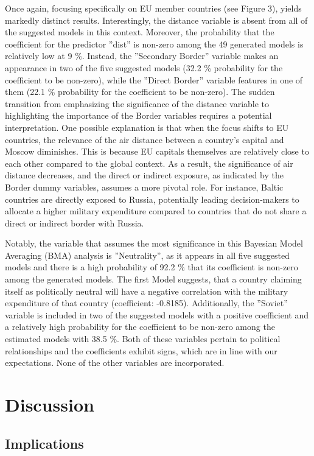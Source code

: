 \documentclass[12pt,a4paper]{article}
\begin{document}
Once again, focusing specifically on EU member countries (see Figure 3), yields markedly distinct results. Interestingly, the distance variable is absent from all of the suggested models in this context. Moreover, the probability that the coefficient for the predictor ''dist'' is non-zero among the 49 generated models is relatively low at 9 \%. Instead, the ''Secondary Border'' variable makes an appearance in two of the five suggested models (32.2 \% probability for the coefficient to be non-zero), while the ''Direct Border'' variable features in one of them (22.1 \% probability for the coefficient to be non-zero). The sudden transition from emphasizing the significance of the distance variable to highlighting the importance of the Border variables requires a potential interpretation. One possible explanation is that when the focus shifts to EU countries, the relevance of the air distance between a country's capital and Moscow diminishes. This is because EU capitals themselves are relatively close to each other compared to the global context. As a result, the significance of air distance decreases, and the direct or indirect exposure, as indicated by the Border dummy variables, assumes a more pivotal role. For instance, Baltic countries are directly exposed to Russia, potentially leading decision-makers to allocate a higher military expenditure compared to countries that do not share a direct or indirect border with Russia.

Notably, the variable that assumes the most significance in this Bayesian Model Averaging (BMA) analysis is ''Neutrality'', as it appears in all five suggested models and there is a high probability of 92.2 \% that its coefficient is non-zero among the generated models. The first Model suggests, that a country claiming itself as politically neutral will have a negative correlation with the military expenditure of that country (coefficient: -0.8185). Additionally, the ''Soviet'' variable is included in two of the suggested models with a positive coefficient and a relatively high probability for the coefficient to be non-zero among the estimated models with 38.5 \%.  Both of these variables pertain to political relationships and the coefficients exhibit signs, which are in line with our expectations. None of the other variables are incorporated.


\section{Discussion}
\subsection{Implications}
\end{document}
